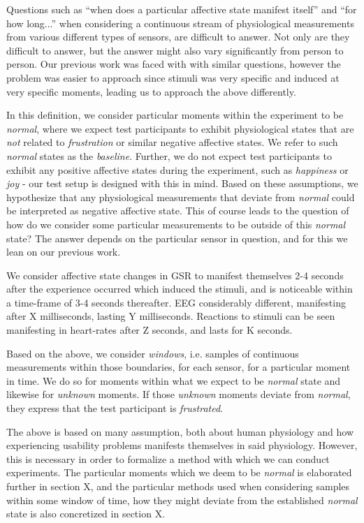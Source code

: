 Questions such as ``when does a particular affective state manifest itself'' and ``for how long...'' when considering a
continuous stream of physiological measurements from various different types of sensors, are difficult to answer. Not
only are they difficult to answer, but the answer might also vary significantly from person to person. Our previous work
was faced with with similar questions, however the problem was easier to approach since stimuli was very specific and
induced at very specific moments, leading us to approach the above differently.

In this definition, we consider particular moments within the experiment to be \textit{normal}, where we expect test
participants to exhibit physiological states that are \textit{not} related to \textit{frustration} or similar negative
affective states. We refer to such \textit{normal} states as the \textit{baseline}. Further, we do not expect test
participants to exhibit any positive affective states during the experiment, such as \textit{happiness} or \textit{joy}
- our test setup is designed with this in mind. Based on these assumptions, we hypothesize that any physiological
measurements that deviate from \textit{normal} could be interpreted as negative affective state. This of course leads to
the question of how do we consider some particular measurements to be outside of this \textit{normal} state? The answer
depends on the particular sensor in question, and for this we lean on our previous work.

We consider affective state changes in GSR to manifest themselves 2-4 seconds after the experience occurred which
induced the stimuli, and is noticeable within a time-frame of 3-4 seconds thereafter. EEG considerably different,
manifesting after X milliseconds, lasting Y milliseconds. Reactions to stimuli can be seen manifesting in heart-rates
after Z seconds, and lasts for K seconds. 

Based on the above, we consider \textit{windows}, i.e. samples of continuous measurements within those boundaries, for
each sensor, for a particular moment in time. We do so for moments within what we expect to be \textit{normal} state and
likewise for \textit{unknown} moments. If those \textit{unknown} moments deviate from \textit{normal}, they express that
the test participant is \textit{frustrated}.

The above is based on many assumption, both about human physiology and how experiencing usability problems manifests
themselves in said physiology. However, this is necessary in order to formalize a method with which we can conduct
experiments. The particular moments which we deem to be \textit{normal} is elaborated further in section X, and the
particular methods used when considering samples within some window of time, how they might deviate from the established
\textit{normal} state is also concretized in section X.

